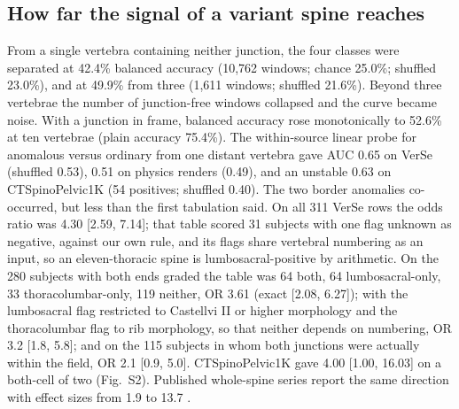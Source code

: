 \documentclass[11pt,letterpaper]{article}
\newcommand{\ci}[2]{[#1, #2]}
\begin{document}
\subsection*{How far the signal of a variant spine reaches}
From a single vertebra containing neither junction, the four classes were separated at 42.4\% balanced accuracy (10,762 windows; chance 25.0\%; shuffled 23.0\%), and at 49.9\% from three (1,611 windows; shuffled 21.6\%). Beyond three vertebrae the number of junction-free windows collapsed and the curve became noise. With a junction in frame, balanced accuracy rose monotonically to 52.6\% at ten vertebrae (plain accuracy 75.4\%). The within-source linear probe for anomalous versus ordinary from one distant vertebra gave AUC 0.65 on VerSe (shuffled 0.53), 0.51 on physics renders (0.49), and an unstable 0.63 on CTSpinoPelvic1K (54 positives; shuffled 0.40). The two border anomalies co-occurred, but less than the first tabulation said. On all 311 VerSe rows the odds ratio was 4.30 \ci{2.59}{7.14}; that table scored 31 subjects with one flag unknown as negative, against our own rule, and its flags share vertebral numbering as an input, so an eleven-thoracic spine is lumbosacral-positive by arithmetic. On the 280 subjects with both ends graded the table was 64 both, 64 lumbosacral-only, 33 thoracolumbar-only, 119 neither, OR 3.61 (exact \ci{2.08}{6.27}); with the lumbosacral flag restricted to Castellvi II or higher morphology and the thoracolumbar flag to rib morphology, so that neither depends on numbering, OR 3.2 \ci{1.8}{5.8}; and on the 115 subjects in whom both junctions were actually within the field, OR 2.1 \ci{0.9}{5.0}. CTSpinoPelvic1K gave 4.00 \ci{1.00}{16.03} on a both-cell of two (Fig.~S2). Published whole-spine series report the same direction with effect sizes from 1.9 to 13.7 \citep{jung2024}.
\end{document}
